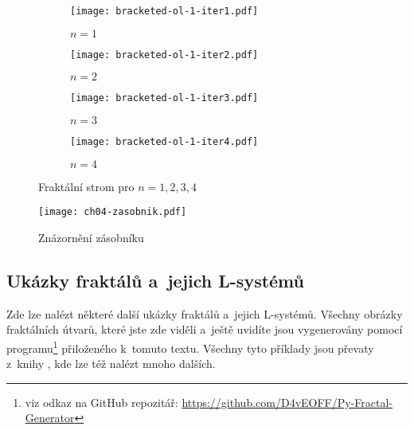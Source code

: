 \begin{figure}[H]
    \centering
    \begin{subfigure}{0.3\textwidth}
        \centering
        \texttt{[image: bracketed-ol-1-iter1.pdf]}
        \begin{center}
            $n=1$
        \end{center}
    \end{subfigure}
    \begin{subfigure}{0.3\textwidth}
        \centering
        \texttt{[image: bracketed-ol-1-iter2.pdf]}
        \begin{center}
            $n=2$
        \end{center}
    \end{subfigure}
    \begin{subfigure}{0.3\textwidth}
        \centering
        \texttt{[image: bracketed-ol-1-iter3.pdf]}
        \begin{center}
            $n=3$
        \end{center}
    \end{subfigure}
    \begin{subfigure}{0.6\textwidth}
        \centering
        \texttt{[image: bracketed-ol-1-iter4.pdf]}
        \begin{center}
            $n=4$
        \end{center}
    \end{subfigure}
    \caption{Fraktální strom pro $n=1,2,3,4$}
    \label{fig:fraktalni-strom}
\end{figure}
\begin{figure}[H]
    \centering
    \texttt{[image: ch04-zasobnik.pdf]}
    \caption{Znázornění zásobníku}
    \label{fig:zasobnik}
\end{figure}

\subsection{Ukázky fraktálů a~jejich L-systémů}\label{subsec:ukazky-fraktalu-lsystemy}

Zde lze nalézt některé další ukázky fraktálů a~jejich L-systémů. Všechny obrázky fraktálních útvarů, které jste zde viděli a~ještě uvidíte jsou vygenerovány pomocí programu\footnote{viz odkaz na GitHub repozitář: \url{https://github.com/D4vEOFF/Py-Fractal-Generator}} přiloženého k~tomuto textu. Všechny tyto příklady jsou převaty z~knihy \cite{Prusinkiewicz1990}, kde lze též nalézt mnoho dalších.

